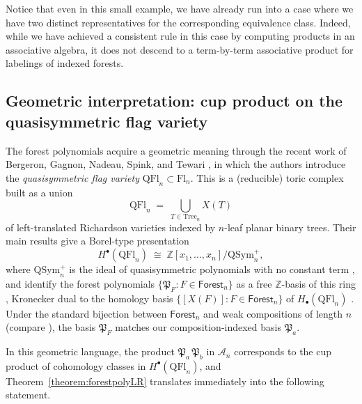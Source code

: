 \documentclass{amsart}
\theoremstyle{definition}
\theoremstyle{remark}
\numberwithin{equation}{subsection}
\newcommand{\coma}{\mathcal{A}}
\newcommand{\forest}{\mathfrak{P}}
\begin{document}
Notice that even in this small example, we have already run into a case where we have two distinct representatives for the corresponding equivalence class. Indeed, while we have achieved a consistent rule in this case by computing products in an associative algebra, it does not descend to a term-by-term associative product for labelings of indexed forests.


\subsection{Geometric interpretation: cup product on the quasisymmetric flag variety}\label{subsection:qflbranch}

The forest polynomials acquire a geometric meaning through the recent work of Bergeron, Gagnon, Nadeau, Spink, and Tewari \cite{bergeron2025qsymflag}, in which the authors introduce the \emph{quasisymmetric flag variety} $\mathrm{QFl}_n\subset \mathrm{Fl}_n$. This is a (reducible) toric complex built as a union
$$\mathrm{QFl}_n \;=\; \bigcup_{T\in\mathrm{Tree}_n} X(T)$$
of left-translated Richardson varieties indexed by $n$-leaf planar binary trees. Their main results give a Borel-type presentation
$$H^\bullet(\mathrm{QFl}_n) \;\cong\; \mathbb{Z}[x_1,\ldots,x_n]/\mathrm{QSym}_n^+,$$
where $\mathrm{QSym}_n^+$ is the ideal of quasisymmetric polynomials with no constant term \cite[Theorem~A and Corollary~12.5]{bergeron2025qsymflag}, and identify the forest polynomials $\{\forest_F : F\in \mathsf{Forest}_n\}$ as a free $\mathbb{Z}$-basis of this ring \cite[Corollary~12.5]{bergeron2025qsymflag}, Kronecker dual to the homology basis $\{[X(F)] : F\in\mathsf{Forest}_n\}$ of $H_\bullet(\mathrm{QFl}_n)$ \cite[Corollary~11.6, Theorem~12.12]{bergeron2025qsymflag}. Under the standard bijection between $\mathsf{Forest}_n$ and weak compositions of length $n$ (compare \cite{nadeau2024forest}), the basis $\forest_F$ matches our composition-indexed basis $\forest_a$.

In this geometric language, the product $\forest_a\,\forest_b$ in $\coma_n$ corresponds to the cup product of cohomology classes in $H^\bullet(\mathrm{QFl}_n)$, and Theorem~\ref{theorem:forestpolyLR} translates immediately into the following statement.
\end{document}
